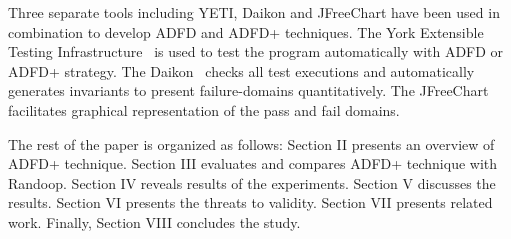 \documentclass[runningheads,a4paper]{llncs}
\begin{document}
Three separate tools including YETI, Daikon and JFreeChart have been used in combination to develop ADFD and ADFD+ techniques. The York Extensible Testing Infrastructure~\cite{Oriol2011yeti} is used to test the program automatically with ADFD or ADFD+ strategy. The Daikon~\cite{ernst2007daikon} checks all test executions and automatically generates invariants to present failure-domains quantitatively. The JFreeChart~\cite{gilbert2008jfreechart} facilitates graphical representation of the pass and fail domains.












The rest of the paper is organized as follows: Section II presents an overview of ADFD+ technique. Section III evaluates and compares ADFD+ technique with Randoop. Section IV reveals results of the experiments. Section V discusses the results. Section VI presents the threats to validity. Section VII presents related work. Finally, Section VIII concludes the study.


 


 


\end{document}
